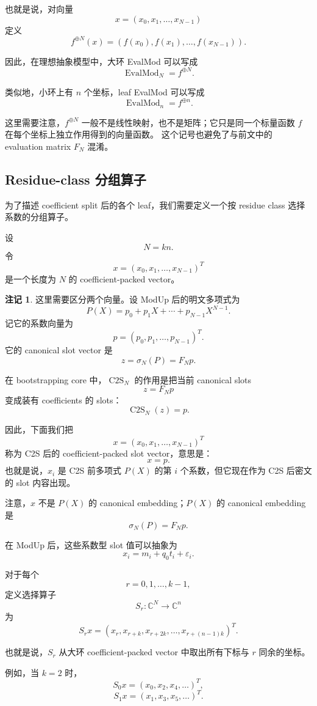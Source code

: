 \documentclass[UTF8,11pt]{ctexart}
\theoremstyle{definition}
\newtheorem{remark}{注记}
\newcommand{\CtwoS}{\operatorname{C2S}}
\newcommand{\EvalMod}{\operatorname{EvalMod}}
\begin{document}
也就是说，对向量
\[
x=(x_0,x_1,\ldots,x_{N-1})
\]
定义
\[
f^{\oplus N}(x)
=
(f(x_0),f(x_1),\ldots,f(x_{N-1})).
\]

因此，在理想抽象模型中，大环 EvalMod 可以写成
\[
\EvalMod_N=f^{\oplus N}.
\]

类似地，小环上有 \(n\) 个坐标，leaf EvalMod 可以写成
\[
\EvalMod_n=f^{\oplus n}.
\]

这里需要注意，\(f^{\oplus N}\) 一般不是线性映射，也不是矩阵；它只是同一个标量函数 \(f\) 在每个坐标上独立作用得到的向量函数。
这个记号也避免了与前文中的 evaluation matrix \(F_N\) 混淆。

\subsection{Residue-class 分组算子}

为了描述 coefficient split 后的各个 leaf，我们需要定义一个按 residue class 选择系数的分组算子。

设
\[
N=kn.
\]
令
\[
x=(x_0,x_1,\ldots,x_{N-1})^T
\]
是一个长度为 \(N\) 的 coefficient-packed vector。

\begin{remark}
    这里需要区分两个向量。设 ModUp 后的明文多项式为
\[
P(X)=p_0+p_1X+\cdots+p_{N-1}X^{N-1}.
\]
记它的系数向量为
\[
p=(p_0,p_1,\ldots,p_{N-1})^T.
\]
它的 canonical slot vector 是
\[
z=\sigma_N(P)=F_Np.
\]

在 bootstrapping core 中，\(\CtwoS_N\) 的作用是把当前 canonical slots
\[
z=F_Np
\]
变成装有 coefficients 的 slots：
\[
\CtwoS_N(z)=p.
\]

因此，下面我们把
\[
x=(x_0,x_1,\ldots,x_{N-1})^T
\]
称为 C2S 后的 coefficient-packed slot vector，意思是：
\[
x=p.
\]
也就是说，\(x_i\) 是 C2S 前多项式 \(P(X)\) 的第 \(i\) 个系数，但它现在作为 C2S 后密文的 slot 内容出现。

注意，\(x\) 不是 \(P(X)\) 的 canonical embedding；\(P(X)\) 的 canonical embedding 是
\[
\sigma_N(P)=F_Np.
\]

在 ModUp 后，这些系数型 slot 值可以抽象为
\[
x_i=m_i+q_0t_i+\varepsilon_i.
\]
\end{remark}

对于每个
\[
r=0,1,\ldots,k-1,
\]
定义选择算子
\[
S_r:\mathbb{C}^N\to \mathbb{C}^n
\]
为
\[
S_rx
=
(x_r,x_{r+k},x_{r+2k},\ldots,x_{r+(n-1)k})^T.
\]

也就是说，\(S_r\) 从大环 coefficient-packed vector 中取出所有下标与 \(r\) 同余的坐标。

例如，当 \(k=2\) 时，
\[
S_0x=(x_0,x_2,x_4,\ldots)^T,
\]
\[
S_1x=(x_1,x_3,x_5,\ldots)^T.
\]
\end{document}
